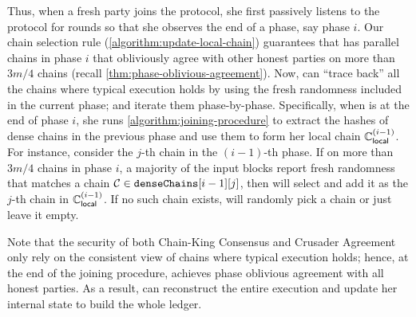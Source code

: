 Thus, when a fresh party \newParty joins the protocol, she first passively listens to the protocol for \phaseLength rounds so that she observes the end of a phase, say phase $i$.
%
Our chain selection rule (\cref{algorithm:update-local-chain}) guarantees that \newParty has parallel chains in phase $i$ that obliviously agree with other honest parties on more than $3m/4$ chains (recall \cref{thm:phase-oblivious-agreement}).
%
Now, \newParty can ``trace back'' all the chains where typical execution holds by using the fresh randomness included in the current phase; and iterate them phase-by-phase.
%
Specifically, when \newParty is at the end of phase $i$, she runs \cref{algorithm:joining-procedure} to extract the hashes of dense chains in the previous phase and use them to form her local chain $\mathbb{C}_{\mathsf{local}}^{(i - 1)}$.
%
For instance, consider the $j$-th chain in the $(i - 1)$-th phase.
%
If on more than $3m/4$ chains in phase $i$, a majority of the input blocks report fresh randomness that matches a chain $\mathcal{C} \in \mathtt{denseChains}[i - 1][j]$, then \newParty will select \chain and add it as the $j$-th chain in $\mathbb{C}_{\mathsf{local}}^{(i - 1)}$.
%
If no such chain exists, \newParty will randomly pick a chain or just leave it empty.



Note that the security of both Chain-King Consensus and Crusader Agreement only rely on the consistent view of chains where typical execution holds; hence, at the end of the joining procedure, \newParty achieves phase oblivious agreement with all honest parties.
%
As a result, \newParty can reconstruct the entire execution and update her internal state to build the whole ledger.
